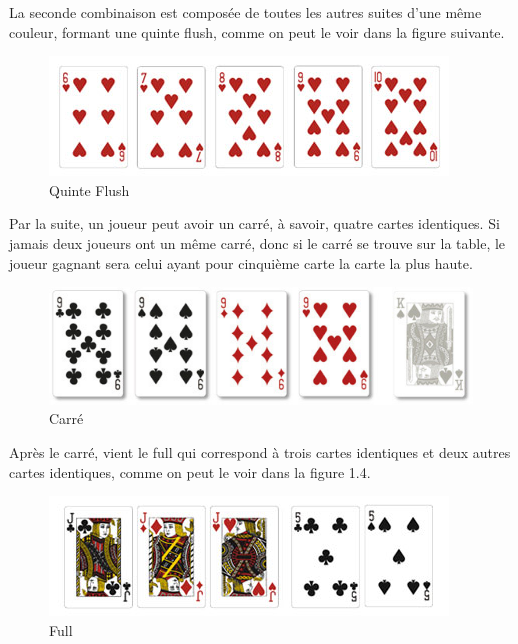 \documentclass{report}
\begin{document}
La seconde combinaison est composée de toutes les autres suites d'une même couleur, formant une quinte flush, comme on peut le voir dans la figure suivante.\par

		\begin{figure}[h]
			\begin{center}
				\includegraphics[scale=0.4]{./imagesRapport/quinteFlush.jpg}
			\end{center}
			\caption[Quinte Flush]{Quinte Flush}
		\end{figure}
		\medskip
\newpage
Par la suite, un joueur peut avoir un carré, à savoir, quatre cartes identiques. Si jamais deux joueurs ont un même carré, donc si le carré se trouve sur la table, le joueur gagnant sera celui ayant pour cinquième carte la carte la plus haute.\par 

		\begin{figure}[h]
			\begin{center}
				\includegraphics[scale=0.3]{./imagesRapport/carre.jpg}
			\end{center}
			\caption[Carré]{Carré}
		\end{figure}
		\medskip



Après le carré, vient le full qui correspond à trois cartes identiques et deux autres cartes identiques, comme on peut le voir dans la figure 1.4. \par


		\begin{figure}[h]
			\begin{center}
				\includegraphics[scale=0.4]{./imagesRapport/full.jpg}
			\end{center}
			\caption[Full]{Full}
		\end{figure}
		\medskip
\end{document}
